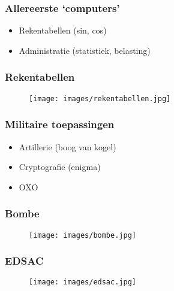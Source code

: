 \documentclass[aspectratio=43]{uva-inf-presentation}
\begin{document}
\begin{frame}
\frametitle{Allereerste `computers'}

\begin{itemize}
\item Rekentabellen (sin, cos)
\item Administratie (statistiek, belasting)
\end{itemize}

\end{frame}


\begin{frame}
\frametitle{Rekentabellen}

\begin{figure}
\texttt{[image: images/rekentabellen.jpg]}
\end{figure}

\end{frame}


\begin{frame}
\frametitle{Militaire toepassingen}

\begin{itemize}
\item Artillerie (boog van kogel)
\item Cryptografie (enigma)
\item OXO
\end{itemize}

\end{frame}


\begin{frame}
\frametitle{Bombe}

\begin{figure}
\texttt{[image: images/bombe.jpg]}
\end{figure}

\end{frame}


\begin{frame}
\frametitle{EDSAC}

\begin{figure}
\texttt{[image: images/edsac.jpg]}
\end{figure}

\end{frame}
\end{document}
